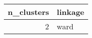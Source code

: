 \begin{tabular}{rl}
\toprule
n_clusters & linkage \\
\midrule
2 & ward \\
\bottomrule
\end{tabular}
